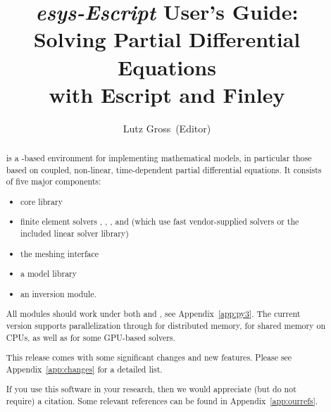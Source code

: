 \documentclass{esysdoc}
\title{\emph{esys-Escript} User's Guide:\\ Solving Partial Differential Equations\\ with Escript and Finley}
\author{Lutz Gross\etal~(Editor)}
\date{\reldate}
\begin{document}
\maketitle

\ifpdf
{}
\fi





\begin{abstract}%
\escript is a \PYTHON-based environment for implementing mathematical models, in particular those based on coupled, non-linear, time-dependent partial differential equations.
It consists of five major components:
\begin{itemize}
\item \escript core library
\item finite element solvers \finley, \dudley, \ripley, and \speckley (which
    use fast vendor-supplied solvers or the included \PASO linear solver library)
\item the meshing interface \pycad
\item a model library
\item an inversion module.
\end{itemize}

All \escript modules should work under both  and , see
Appendix~\ref{app:py3}.
The current version supports parallelization through \MPI for distributed
memory, \OPENMP for shared memory on CPUs, as well as \CUDA for some GPU-based
solvers.

This release comes with some significant changes and new features.
Please see Appendix~\ref{app:changes} for a detailed list.

If you use this software in your research, then we would appreciate (but do not
require) a citation.
Some relevant references can be found in Appendix~\ref{app:ourrefs}.
\end{abstract}


\cleardoublepage{}%
\tableofcontents














\esysappendix %

%


\cleardoublepage
{}
{}
\printindex

\cleardoublepage
{}
{}


\end{document}

